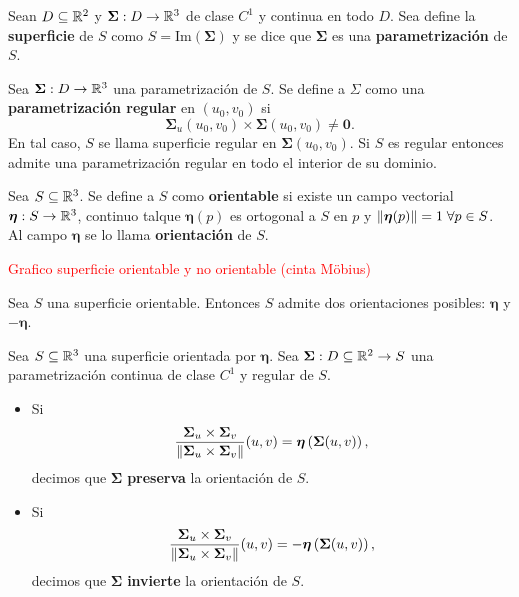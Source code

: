 \begin{definition}
    Sean $D\subseteq\mathbb{R}^2$ y $\boldsymbol{\Sigma}:D\to\mathbb{R}^3$ de clase $C^1$ y continua en todo $D$. Sea define la \textbf{superficie} de $S$ como $S=\text{Im}(\boldsymbol{\Sigma})$ y se dice que $\boldsymbol{\Sigma}$ es una \textbf{parametrizaci\'on} de $S$.
\end{definition}

\begin{definition}
    Sea $\boldsymbol{\Sigma}:D\to\mathbb{R}^3$ una parametrizaci\'on de $S$. Se define a $\Sigma$ como una \textbf{parametrizaci\'on regular} en $(u_0, v_0)$ si
    \[
        \boldsymbol{\Sigma}_u(u_0,v_0)\times\boldsymbol{\Sigma}(u_0,v_0)\neq \boldsymbol{0}.
    \]
    En tal caso, $S$ se llama superficie regular en $\boldsymbol{\Sigma}(u_0,v_0)$. Si $S$ es regular entonces admite una parametrizaci\'on regular en todo el interior de su dominio.
\end{definition}

\begin{definition}
    Sea $S\subseteq\mathbb{R}^3$. Se define a $S$ como \textbf{orientable} si existe un campo vectorial $\boldsymbol{\eta}:S\to\mathbb{R}^3$, continuo talque $\boldsymbol{\eta}(p)$ es ortogonal a $S$ en $p$ y $\norm{\boldsymbol{\eta}(p)}=1\;\forall p\in S$. Al campo $\boldsymbol{\eta}$ se lo llama \textbf{orientaci\'on} de $S$.
\end{definition}

\textcolor{red}{Grafico superficie orientable y no orientable (cinta Möbius)}

\begin{obs}
    Sea $S$ una superficie orientable. Entonces $S$ admite dos orientaciones posibles: $\boldsymbol{\eta}$ y $-\boldsymbol{\eta}$.
\end{obs}

\begin{definition}
    Sea $S\subseteq\mathbb{R}^3$ una superficie orientada por $\boldsymbol{\eta}$. Sea $\boldsymbol{\Sigma}:D\subseteq\mathbb{R}^2\to S$ una parametrizaci\'on continua de clase $C^1$ y regular de $S$.
    \begin{itemize}
        \item Si \[
            \frac{\boldsymbol{\Sigma}_u\times\boldsymbol{\Sigma}_v}{\norm{\boldsymbol{\Sigma}_u\times\boldsymbol{\Sigma}_v}}(u,v)=\boldsymbol{\eta}\left(\boldsymbol{\Sigma}(u,v)\right),
        \]  
        decimos que $\boldsymbol{\Sigma}$ \textbf{preserva} la orientaci\'on de $S$.
        \item Si \[
            \frac{\boldsymbol{\Sigma}_u\times\boldsymbol{\Sigma}_v}{\norm{\boldsymbol{\Sigma}_u\times\boldsymbol{\Sigma}_v}}(u,v)=-\boldsymbol{\eta}\left(\boldsymbol{\Sigma}(u,v)\right),
        \]
        decimos que $\boldsymbol{\Sigma}$ \textbf{invierte} la orientaci\'on de $S$.  
    \end{itemize}
\end{definition}


